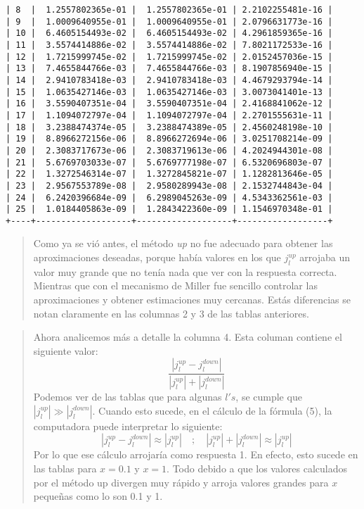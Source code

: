 \documentclass[9pt]{article}
\begin{document}
\begin{Verbatim}[commandchars=\\\{\}]
| 8  |  1.2557802365e-01 |  1.2557802365e-01 | 2.2102255481e-16 |
| 9  |  1.0009640955e-01 |  1.0009640955e-01 | 2.0796631773e-16 |
| 10 |  6.4605154493e-02 |  6.4605154493e-02 | 4.2961859365e-16 |
| 11 |  3.5574414886e-02 |  3.5574414886e-02 | 7.8021172533e-16 |
| 12 |  1.7215999745e-02 |  1.7215999745e-02 | 2.0152457036e-15 |
| 13 |  7.4655844766e-03 |  7.4655844766e-03 | 8.1907856940e-15 |
| 14 |  2.9410783418e-03 |  2.9410783418e-03 | 4.4679293794e-14 |
| 15 |  1.0635427146e-03 |  1.0635427146e-03 | 3.0073041401e-13 |
| 16 |  3.5590407351e-04 |  3.5590407351e-04 | 2.4168841062e-12 |
| 17 |  1.1094072797e-04 |  1.1094072797e-04 | 2.2701555631e-11 |
| 18 |  3.2388474374e-05 |  3.2388474389e-05 | 2.4560248198e-10 |
| 19 |  8.8966272156e-06 |  8.8966272694e-06 | 3.0251708214e-09 |
| 20 |  2.3083717673e-06 |  2.3083719613e-06 | 4.2024944301e-08 |
| 21 |  5.6769703033e-07 |  5.6769777198e-07 | 6.5320696803e-07 |
| 22 |  1.3272546314e-07 |  1.3272845821e-07 | 1.1282813646e-05 |
| 23 |  2.9567553789e-08 |  2.9580289943e-08 | 2.1532744843e-04 |
| 24 |  6.2420396684e-09 |  6.2989045263e-09 | 4.5343362561e-03 |
| 25 |  1.0184405863e-09 |  1.2843422360e-09 | 1.1546970348e-01 |
+----+-------------------+-------------------+------------------+
    \end{Verbatim}

    \begin{quote}
Como ya se vió antes, el método \emph{up} no fue adecuado para obtener
las aproximaciones deseadas, porque había valores en los que
\(j_l^{up}\) arrojaba un valor muy grande que no tenía nada que ver con
la respuesta correcta. Mientras que con el mecanismo de Miller fue
sencillo controlar las aproximaciones y obtener estimaciones muy
cercanas. Estás diferencias se notan claramente en las columnas 2 y 3 de
las tablas anteriores.
\end{quote}

\begin{quote}
Ahora analicemos más a detalle la columna 4. Esta columan contiene el
siguiente valor:
\[\dfrac{|j_{l}^{up}-j_l^{down}|}{|j_{l}^{up}| + |j_l^{down}|} \tag{5}\]
Podemos ver de las tablas que para algunas \(l's\), se cumple que
\(|j_{l}^{up}|\gg|j_l^{down}|\). Cuando esto sucede, en el cálculo de la
fórmula (5), la computadora puede interpretar lo siguiente:
\[|j_{l}^{up}-j_l^{down}|\approx|j_{l}^{up}|\quad;\quad |j_{l}^{up}| + |j_l^{down}|\approx |j_{l}^{up}| \]
Por lo que ese cálculo arrojaría como respuesta 1. En efecto, esto
sucede en las tablas para \(x=0.1\) y \(x=1\). Todo debido a que los
valores calculados por el método up divergen muy rápido y arroja valores
grandes para \(x\) pequeñas como lo son 0.1 y 1.
\end{quote}


    
    
    
\end{document}
